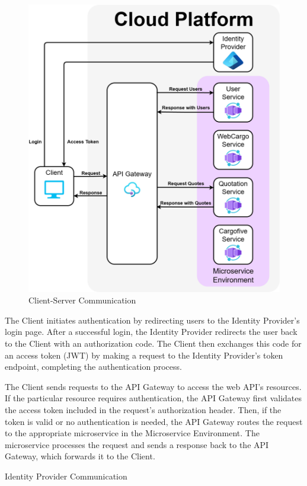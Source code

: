 \documentclass[12pt,reqno, oneside]{amsbook}
\makeatletter
\def\subsection{\@startsection{subsection}{2}%
      \z@{.5\linespacing\@plus.7\linespacing}{.25\linespacing}%
      {\normalfont\bfseries\flushleft}}
\theoremstyle{definition}
\theoremstyle{definition}
\numberwithin{section}{chapter}
\numberwithin{table}{chapter}
\numberwithin{figure}{chapter}
\makeatother
\begin{document}
\begin{figure}[H]
  \centering
  \includegraphics[width=0.9\linewidth]{images/ClientServerCommunication.png}
  \caption{\label{Figure:ClientServerCommunication}Client-Server Communication}
\end{figure}

The Client initiates authentication by redirecting users to the Identity Provider's login page. After a successful login, the Identity Provider redirects the user back to the Client with an authorization code. The Client then exchanges this code for an access token (\ac{JWT}) by making a request to the Identity Provider's token endpoint, completing the authentication process.

The Client sends requests to the \ac{API} Gateway to access the web \ac{API}'s resources. If the particular resource requires authentication, the \ac{API} Gateway first validates the access token included in the request's authorization header. Then, if the token is valid or no authentication is needed, the \ac{API} Gateway routes the request to the appropriate microservice in the Microservice Environment. The microservice processes the request and sends a response back to the \ac{API} Gateway, which forwards it to the Client.

\subsection{Identity Provider Communication}
\end{document}
